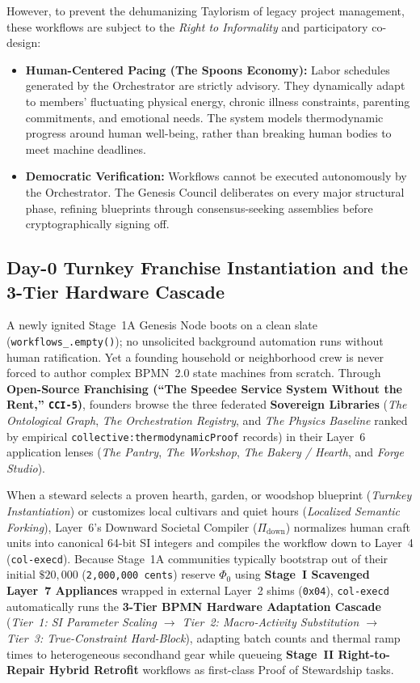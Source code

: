 However, to prevent the dehumanizing Taylorism of legacy project management, these workflows are subject to the \textit{Right to Informality} and participatory co-design:
\begin{itemize}
    \item \textbf{Human-Centered Pacing (The Spoons Economy):} Labor schedules generated by the Orchestrator are strictly advisory. They dynamically adapt to members' fluctuating physical energy, chronic illness constraints, parenting commitments, and emotional needs. The system models thermodynamic progress around human well-being, rather than breaking human bodies to meet machine deadlines.
    \item \textbf{Democratic Verification:} Workflows cannot be executed autonomously by the Orchestrator. The Genesis Council deliberates on every major structural phase, refining blueprints through consensus-seeking assemblies \parencite{mansbridge1980, ostrom1990} before cryptographically signing off.
\end{itemize}

\subsection{Day-0 Turnkey Franchise Instantiation and the 3-Tier Hardware Cascade}

A newly ignited Stage~1A Genesis Node boots on a clean slate (\texttt{workflows\_.empty()}); no unsolicited background automation runs without human ratification. Yet a founding household or neighborhood crew is never forced to author complex BPMN~2.0 state machines from scratch. Through \textbf{Open-Source Franchising (``The Speedee Service System Without the Rent,'' \texttt{CCI-5})}, founders browse the three federated \textbf{Sovereign Libraries} (\textit{The Ontological Graph}, \textit{The Orchestration Registry}, and \textit{The Physics Baseline} ranked by empirical \texttt{collective:thermodynamicProof} records) in their Layer~6 application lenses (\textit{The Pantry}, \textit{The Workshop}, \textit{The Bakery / Hearth}, and \textit{Forge Studio}).

When a steward selects a proven hearth, garden, or woodshop blueprint (\textit{Turnkey Instantiation}) or customizes local cultivars and quiet hours (\textit{Localized Semantic Forking}), Layer~6's Downward Societal Compiler ($\Pi_{\mathrm{down}}$) normalizes human craft units into canonical 64-bit SI integers and compiles the workflow down to Layer~4 (\texttt{col-execd}). Because Stage~1A communities typically bootstrap out of their initial $\$20{,}000$ (\texttt{2,000,000 cents}) reserve $\Phi_0$ using \textbf{Stage~I Scavenged Layer~7 Appliances} wrapped in external Layer~2 shims (\texttt{0x04}), \texttt{col-execd} automatically runs the \textbf{3-Tier BPMN Hardware Adaptation Cascade} (\textit{Tier~1: SI Parameter Scaling $\to$ Tier~2: Macro-Activity Substitution $\to$ Tier~3: True-Constraint Hard-Block}), adapting batch counts and thermal ramp times to heterogeneous secondhand gear while queueing \textbf{Stage~II Right-to-Repair Hybrid Retrofit} workflows as first-class Proof of Stewardship tasks.

